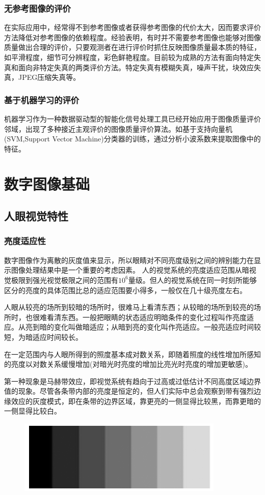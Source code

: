 \documentclass[11pt]{article}
\begin{document}
\subsubsection{无参考图像的评价}
在实际应用中，经常得不到参考图像或者获得参考图像的代价太大，因而要求评价方法降低对参考图像的依赖程度。经验表明，有时并不需要参考图像也能够对图像质量做出合理的评价，只要观测者在进行评价时抓住反映图像质量最本质的特征，如平滑程度，细节可分辨程度，彩色鲜艳程度。目前较为成熟的方法有面向特定失真和面向非特定失真的两类评价方法。特定失真有模糊失真，噪声干扰，块效应失真，JPEG压缩失真等。
\subsubsection{基于机器学习的评价}
机器学习作为一种数据驱动型的智能化信号处理工具已经开始应用于图像质量评价邻域，出现了多种接近主观评价的图像质量评价算法。如基于支持向量机(SVM,Support Vector Machine)分类器的训练，通过分析小波系数来提取图像中的特征。
\section{数字图像基础}
\subsection{人眼视觉特性}
\subsubsection{亮度适应性}
数字图像作为离散的灰度值来显示，所以眼睛对不同亮度级别之间的辨别能力在显示图像处理结果中是一个重要的考虑因素。
人的视觉系统的亮度适应范围从暗视觉极限到强光视觉极限之间的范围有$10^6$量级。但人的视觉系统在同一时刻所能够区分的亮度的具体范围比总的适应范围要小得多，一般仅在几十级亮度左右。

人眼从较亮的场所到较暗的场所时，很难马上看清东西；从较暗的场所到较亮的场所时，也很难看清东西。一般把眼睛的状态适应明暗条件的变化过程叫作亮度适应。从亮到暗的变化叫做暗适应；从暗到亮的变化叫作亮适应。一般亮适应时间较短，为暗适应时间较长。

在一定范围内与人眼所得到的照度基本成对数关系，即随着照度的线性增加所感知的亮度以对数关系缓慢增加(对暗光时亮度的增加比亮光时亮度的增加更敏感)。

第一种现象是马赫带效应，即视觉系统有趋向于过高或过低估计不同高度区域边界值的现象。尽管各条带内部的亮度是恒定的，但人们实际中总会观察到带有强烈边缘效应的灰度模式，即在条带的边界区域，靠更亮的一侧显得比较黑，而靠更暗的一侧显得比较白。
\begin{figure}[H]
	\centering
	\includegraphics[scale=0.5]{5}
\end{figure}
\end{document}
